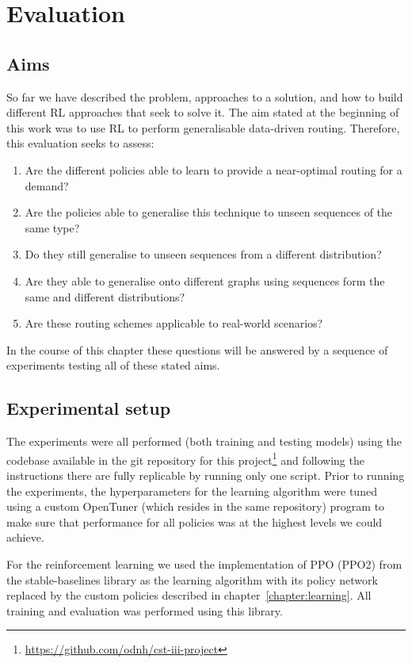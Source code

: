 \chapter{Evaluation}
\label{chapter:evaluation}

\section{Aims}
So far we have described the problem, approaches to a solution, and how to build different RL approaches that seek to solve it. The aim stated at the beginning of this work was to use RL to perform generalisable data-driven routing. Therefore, this evaluation seeks to assess:

\begin{enumerate}
\item Are the different policies able to learn to provide a near-optimal routing for a demand?
\item Are the policies able to generalise this technique to unseen sequences of the same type?
\item Do they still generalise to unseen sequences from a different distribution?
\item Are they able to generalise onto different graphs using sequences form the same and different distributions?
\item Are these routing schemes applicable to real-world scenarios?
\end{enumerate}

In the course of this chapter these questions will be answered by a sequence of experiments testing all of these stated aims.


\section{Experimental setup}
The experiments were all performed (both training and testing models) using the codebase available in the git repository for this project\footnote{\url{https://github.com/odnh/cst-iii-project}} and following the instructions there are fully replicable by running only one script. Prior to running the experiments, the hyperparameters for the learning algorithm were tuned using a custom OpenTuner\cite{ansel2014opentuner} (which resides in the same repository) program to make sure that performance for all policies was at the highest levels we could achieve.

For the reinforcement learning we used the implementation of PPO (PPO2) from the stable-baselines\cite{stable-baselines} library as the learning algorithm with its policy network replaced by the custom policies described in chapter~\ref{chapter:learning}. All training and evaluation was performed using this library.


